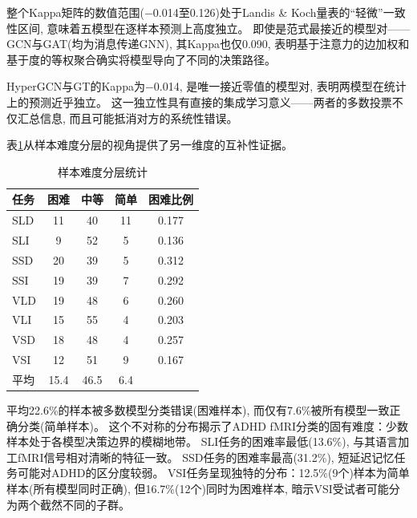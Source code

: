 \documentclass[12pt,a4paper,heading=true,fontset=windows]{ctexart}
\newcommand{\kw}[1]{{\heiti #1}}
\begin{document}
整个Kappa矩阵的数值范围($-$0.014至0.126)处于Landis \& Koch量表的``轻微''一致性区间,
意味着\kw{五模型在逐样本预测上高度独立}。
即使是范式最接近的模型对——GCN与GAT(均为消息传递GNN),
其Kappa也仅0.090, 表明基于注意力的边加权和基于度的等权聚合确实将模型导向了不同的决策路径。

HyperGCN与GT的Kappa为$-$0.014, 是唯一接近零值的模型对,
表明两模型在统计上的预测近乎独立。
这一独立性具有直接的集成学习意义——两者的多数投票不仅汇总信息, 而且可能抵消对方的系统性错误。

表\ref{tab:difficulty}从样本难度分层的视角提供了另一维度的互补性证据。

\begin{table}[H]
    \centering
    \caption{样本难度分层统计}
    \label{tab:difficulty}
    \small
    \begin{tabular}{lcccc}
        \toprule
        \textbf{任务} & \textbf{困难} & \textbf{中等} & \textbf{简单} & \textbf{困难比例} \\
        \midrule
        SLD         & 11          & 40          & 11          & 0.177         \\
        SLI         & 9           & 52          & 5           & 0.136         \\
        SSD         & 20          & 39          & 5           & 0.312         \\
        SSI         & 19          & 39          & 7           & 0.292         \\
        VLD         & 19          & 48          & 6           & 0.260         \\
        VLI         & 15          & 55          & 4           & 0.203         \\
        VSD         & 18          & 48          & 4           & 0.257         \\
        VSI         & 12          & 51          & 9           & 0.167         \\
        \midrule
        平均          & 15.4        & 46.5        & 6.4         & \kw{0.226}    \\
        \bottomrule
    \end{tabular}
\end{table}

平均22.6\%的样本被多数模型分类错误(困难样本), 而仅有7.6\%被所有模型一致正确分类(简单样本)。
这个不对称的分布揭示了ADHD fMRI分类的固有难度：少数样本处于各模型决策边界的模糊地带。
SLI任务的困难率最低(13.6\%), 与其语言加工fMRI信号相对清晰的特征一致。
SSD任务的困难率最高(31.2\%), 短延迟记忆任务可能对ADHD的区分度较弱。
VSI任务呈现独特的分布：12.5\%(9个)样本为简单样本(所有模型同时正确),
但16.7\%(12个)同时为困难样本, 暗示VSI受试者可能分为两个截然不同的子群。
\end{document}

